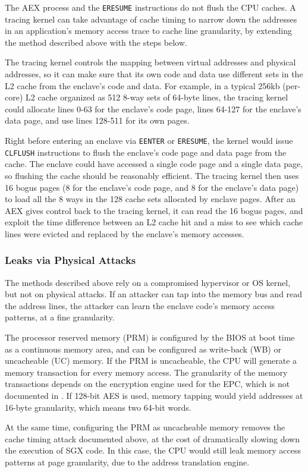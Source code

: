The AEX process and the \texttt{ERESUME} instructions do not flush the CPU
caches. A tracing kernel can take advantage of cache timing to narrow down
the addresses in an application's memory access trace to cache line
granularity, by extending the method described above with the steps below.

The tracing kernel controls the mapping between virtual addresses and physical
addresses, so it can make sure that its own code and data use different sets
in the L2 cache from the enclave's code and data. For example, in a typical
256kb (per-core) L2 cache organized as 512 8-way sets of 64-byte lines, the
tracing kernel could allocate lines 0-63 for the enclave's code page, lines
64-127 for the enclave's data page, and use lines 128-511 for its own pages.

Right before entering an enclave via \texttt{EENTER} or \texttt{ERESUME}, the
kernel would issue \texttt{CLFLUSH} instructions to flush the enclave's code
page and data page from the cache. The enclave could have accessed a single
code page and a single data page, so flushing the cache should be reasonably
efficient. The tracing kernel then uses 16 bogus pages (8 for the enclave's
code page, and 8 for the enclave's data page) to load all the 8 ways in the 128
cache sets allocated by enclave pages. After an AEX gives control back to the
tracing kernel, it can read the 16 bogus pages, and exploit the time difference
between an L2 cache hit and a miss to see which cache lines were evicted and
replaced by the enclave's memory accesses.

\subsubsection{Leaks via Physical Attacks}

The methods described above rely on a compromised hypervisor or OS kernel, but
not on physical attacks. If an attacker can tap into the memory bus and read
the address lines, the attacker can learn the enclave code's memory access
patterns, at a fine granularity.

The processor reserved memory (PRM) is configured by the BIOS at boot time as
a continuous memory area, and can be configured as write-back (WB) or
uncacheable (UC) memory. If the PRM is uncacheable, the CPU will generate a
memory transaction for every memory access. The granularity of the memory
transactions depends on the encryption engine used for the EPC, which is not
documented in \cite{intel2013sgxmanual}. If 128-bit AES is used, memory tapping
would yield addresses at 16-byte granularity, which means two 64-bit words.

At the same time, configuring the PRM as uncacheable memory removes the cache
timing attack documented above, at the cost of dramatically slowing down the
execution of SGX code. In this case, the CPU would still leak memory access
patterns at page granularity, due to the address translation engine.
